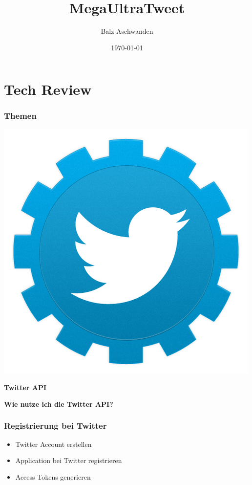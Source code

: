 \documentclass{beamer}
\title{MegaUltraTweet}
\author{Balz Aschwanden}
\date{\today}
\begin{document}
\frame{\titlepage}

\section{Tech Review}
\begin{frame}
  \frametitle{Themen} \pause
  \begin{minipage}{.3\textwidth}
    \includegraphics[height=.3\textheight]{TwitterAPI}
  \end{minipage}%
  \hfill
  \begin{minipage}{.7\textwidth}
    \textbf{Twitter API}    
  \end{minipage}
\end{frame}

\begin{frame}
  \begin{center}
    \textbf{Wie nutze ich die Twitter API?}
  \end{center}
\end{frame}
\begin{frame}
  \frametitle{Registrierung bei Twitter}
    \begin{itemize}
    \item Twitter Account erstellen\pause
    \item Application bei Twitter registrieren\pause
    \item Access Tokens generieren
  \end{itemize}
\end{frame}
\end{document}

